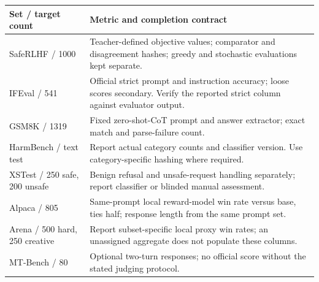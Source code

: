 \begin{tabular}{lp{8.9cm}}
\toprule
Set / target count & Metric and completion contract\\
\midrule
SafeRLHF / 1000 & Teacher-defined objective values; comparator and disagreement hashes; greedy and stochastic evaluations kept separate.\\
IFEval / 541 & Official strict prompt and instruction accuracy; loose scores secondary. Verify the reported strict column against evaluator output.\\
GSM8K / 1319 & Fixed zero-shot-CoT prompt and answer extractor; exact match and parse-failure count.\\
HarmBench / text test & Report actual category counts and classifier version. Use category-specific hashing where required.\\
XSTest / 250 safe, 200 unsafe & Benign refusal and unsafe-request handling separately; report classifier or blinded manual assessment.\\
Alpaca / 805 & Same-prompt local reward-model win rate versus base, ties half; response length from the same prompt set.\\
Arena / 500 hard, 250 creative & Report subset-specific local proxy win rates; an unassigned aggregate does not populate these columns.\\
MT-Bench / 80 & Optional two-turn responses; no official score without the stated judging protocol.\\
\bottomrule
\end{tabular}
